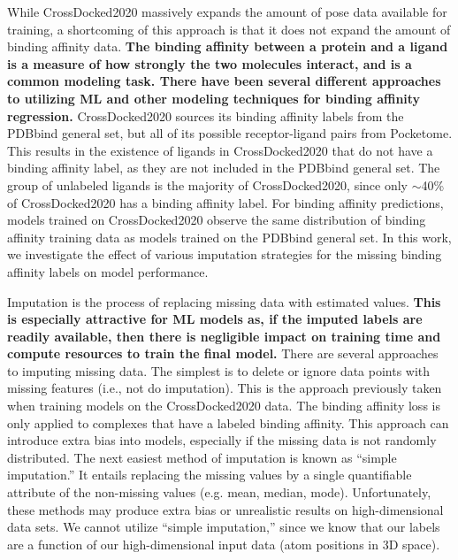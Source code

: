 \documentclass[journal=jcim,manuscript=article]{achemso}
\begin{document}
While CrossDocked2020 massively expands the amount of pose data available for training, a shortcoming of this approach is that it does not expand the amount of binding affinity data.
\textbf{The binding affinity between a protein and a ligand is a measure of how strongly the two molecules interact, and is a common modeling task.
There have been several different approaches to utilizing ML and other modeling techniques for binding affinity regression.\cite{roccoBAreview,zhao2022brief,gu2023protein,crossdocked2020,kdeep,onionnet,pafnuncy,bapa,fusionAff,cang2018representability,NNscore, RFscore,DLscore}}
CrossDocked2020 sources its binding affinity labels from the PDBbind general set, but all of its possible receptor-ligand pairs from Pocketome.\cite{pocketome}
This results in the existence of ligands in CrossDocked2020 that do not have a binding affinity label, as they are not included in the PDBbind general set.
The group of unlabeled ligands is the majority of CrossDocked2020, since only $\sim$40\% of CrossDocked2020 has a binding affinity label.
For binding affinity predictions, models trained on CrossDocked2020 observe the same distribution of binding affinity training data as models trained on the PDBbind general set.
In this work, we investigate the effect of various imputation strategies for the missing binding affinity labels on model performance.

Imputation is the process of replacing missing data with estimated values.\cite{surveyReview1, review2}
\textbf{This is especially attractive for ML models as, if the imputed labels are readily available, then there is negligible impact on training time and compute resources to train the final model.}
There are several approaches to imputing missing data.
The simplest is to delete or ignore data points with missing features (i.e., not do imputation).
This is the approach previously taken when training models on the CrossDocked2020 data.\cite{crossdocked2020}  
The binding affinity loss is only applied to complexes that have a labeled binding affinity.
This approach can introduce extra bias into models, especially if the missing data is not randomly distributed.\cite{rev1support}
The next easiest method of imputation is known as ``simple imputation.''
It entails replacing the missing values by a single quantifiable attribute of the non-missing values (e.g. mean, median, mode).
Unfortunately, these methods may produce extra bias or unrealistic results on high-dimensional data sets.\cite{SICE}
We cannot utilize ``simple imputation,'' since we know that our labels are a function of our high-dimensional input data (atom positions in 3D space).
\end{document}
